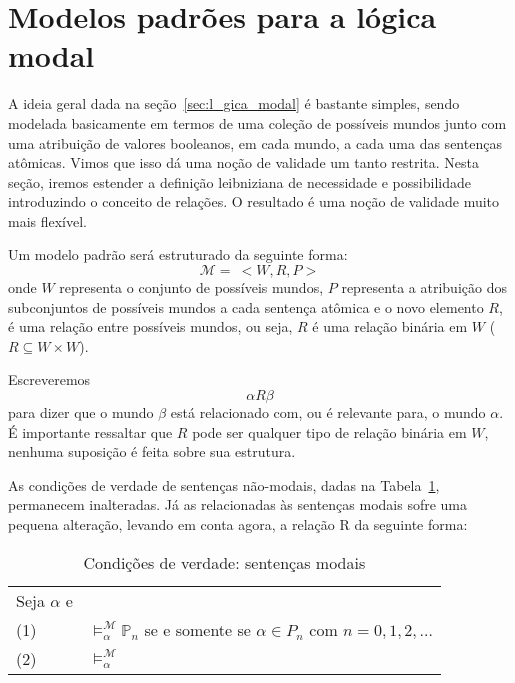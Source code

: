 \section{Modelos padrões para a lógica modal}
\label{sec:modelos_padroes}

A ideia geral dada na seção~\ref{sec:l_gica_modal} é bastante simples, sendo
modelada basicamente em termos de uma coleção de possíveis mundos junto com uma
atribuição de valores booleanos, em cada mundo, a cada uma das sentenças
at\^omicas. Vimos que isso dá uma noção de validade um tanto restrita.
Nesta seção, iremos estender a definição leibniziana de necessidade e
possibilidade introduzindo o conceito de relações. O resultado é uma noção de
validade muito mais flexível.

Um modelo padrão será estruturado da seguinte forma:
\begin{equation}
    \label{eq:mod_padrao}
    \mathcal{M} =\ <W,R,P>
\end{equation}
onde $W$ representa o conjunto de possíveis mundos, $P$ representa a atribuição
dos subconjuntos de possíveis mundos a cada sentença at\^omica e o novo elemento
$R$, é uma relação entre possíveis mundos, ou seja, $R$ é uma relação binária em
$W$ ($R \subseteq W \times W$).

Escreveremos
\begin{equation}
    \alpha R \beta
\end{equation}
para dizer que o mundo $\beta$ está relacionado com, ou é relevante para, o
mundo $\alpha$. É importante ressaltar que $R$ pode ser qualquer tipo de relação
binária em $W$, nenhuma suposição é feita sobre sua estrutura.

As condições de verdade de sentenças não-modais, dadas na
Tabela~\ref{table:truth}, permanecem inalteradas. Já as relacionadas às
sentenças modais sofre uma pequena alteração, levando em conta agora, a relação
R da seguinte forma:

    \begin{table}[h!]
\label{table:truth}
\begin{center}
    \caption{Condições de verdade: sentenças modais}
    \begin{tabular}{ll}
    Seja $\alpha$ e  \\

        \vspace{2mm}
        (1) & $\models ^{\mathcal{M}}_{\alpha} \mathbb{P}_n$ se e somente se $\alpha \in
        P_n$ com $n=0,1,2,\ldots$\\
        (2)  & $\models ^{\mathcal{M}}_{\alpha} $\\

    \end{tabular}
\end{center}
\end{table}

